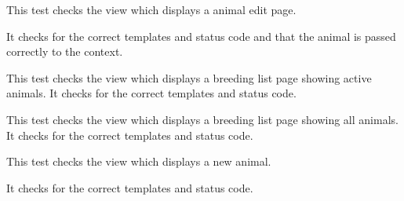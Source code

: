 \documentclass[letterpaper,10pt,english]{sphinxmanual}
\begin{document}
\begin{fulllineitems}
\begin{fulllineitems}
\end{fulllineitems}



\begin{fulllineitems}
\label{api:mousedb.animal.tests.AnimalViewTests.test_animal_edit}
This test checks the view which displays a animal edit page.

It checks for the correct templates and status code and that the animal is passed correctly to the context.

\end{fulllineitems}



\begin{fulllineitems}
\label{api:mousedb.animal.tests.AnimalViewTests.test_animal_list}
This test checks the view which displays a breeding list page showing active animals.  It checks for the correct templates and status code.

\end{fulllineitems}



\begin{fulllineitems}
\label{api:mousedb.animal.tests.AnimalViewTests.test_animal_list_all}
This test checks the view which displays a breeding list page showing all animals.  It checks for the correct templates and status code.

\end{fulllineitems}



\begin{fulllineitems}
\label{api:mousedb.animal.tests.AnimalViewTests.test_animal_new}
This test checks the view which displays a new animal.

It checks for the correct templates and status code.

\end{fulllineitems}


\end{fulllineitems}
\end{document}
